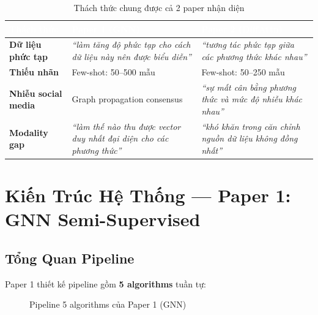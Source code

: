 \documentclass[12pt,a4paper]{article}
\begin{document}
\begin{table}[H]
\centering
\caption{Thách thức chung được cả 2 paper nhận diện}
\label{tab:challenges}
\begin{tabularx}{\textwidth}{>{\bfseries}l X X}
\toprule
\rowcolor{tableheader}
\textcolor{white}{\textbf{Thách thức}} & \textcolor{white}{\textbf{Paper 1 (GNN)}} & \textcolor{white}{\textbf{Paper 2 (DiffAttn)}} \\
\midrule
Dữ liệu phức tạp & \textit{``làm tăng độ phức tạp cho cách dữ liệu này nên được biểu diễn''} & \textit{``tương tác phức tạp giữa các phương thức khác nhau''} \\
Thiếu nhãn & Few-shot: 50--500 mẫu & Few-shot: 50--250 mẫu \\
Nhiễu social media & Graph propagation consensus & \textit{``sự mất cân bằng phương thức và mức độ nhiễu khác nhau''} \\
Modality gap & \textit{``làm thế nào thu được vector duy nhất đại diện cho các phương thức''} & \textit{``khó khăn trong căn chỉnh nguồn dữ liệu không đồng nhất''} \\
\bottomrule
\end{tabularx}
\end{table}

\section{Kiến Trúc Hệ Thống — Paper 1: GNN Semi-Supervised}

\subsection{Tổng Quan Pipeline}

Paper 1 thiết kế pipeline gồm \textbf{5 algorithms} tuần tự:

\begin{figure}[H]
\centering
{}
\caption{Pipeline 5 algorithms của Paper 1 (GNN)}
\label{fig:gnn-pipeline}
\end{figure}
\end{document}
